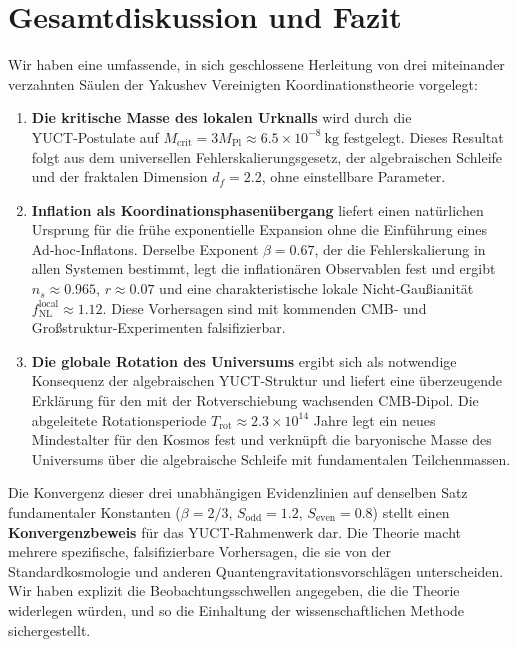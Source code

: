 \documentclass[11pt,a4paper]{article}
\begin{document}
	
	\part{Gesamtdiskussion und Fazit}
	\label{part:conclusion}
	
	Wir haben eine umfassende, in sich geschlossene Herleitung von drei miteinander verzahnten Säulen der Yakushev Vereinigten Koordinationstheorie vorgelegt:
	
	\begin{enumerate}
		\item \textbf{Die kritische Masse des lokalen Urknalls} wird durch die YUCT‑Postulate auf \(M_{\mathrm{crit}} = 3 M_{\mathrm{Pl}} \approx 6.5 \times 10^{-8}\ \text{kg}\) festgelegt. Dieses Resultat folgt aus dem universellen Fehlerskalierungsgesetz, der algebraischen Schleife und der fraktalen Dimension \(d_f = 2.2\), ohne einstellbare Parameter.
		
		\item \textbf{Inflation als Koordinationsphasenübergang} liefert einen natürlichen Ursprung für die frühe exponentielle Expansion ohne die Einführung eines Ad‑hoc‑Inflatons. Derselbe Exponent \(\beta = 0.67\), der die Fehlerskalierung in allen Systemen bestimmt, legt die inflationären Observablen fest und ergibt \(n_s \approx 0.965\), \(r \approx 0.07\) und eine charakteristische lokale Nicht‑Gaußianität \(f_{\mathrm{NL}}^{\mathrm{local}} \approx 1.12\). Diese Vorhersagen sind mit kommenden CMB- und Großstruktur‑Experimenten falsifizierbar.
		
		\item \textbf{Die globale Rotation des Universums} ergibt sich als notwendige Konsequenz der algebraischen YUCT‑Struktur und liefert eine überzeugende Erklärung für den mit der Rotverschiebung wachsenden CMB‑Dipol. Die abgeleitete Rotationsperiode \(T_{\mathrm{rot}} \approx 2.3 \times 10^{14}\) Jahre legt ein neues Mindestalter für den Kosmos fest und verknüpft die baryonische Masse des Universums über die algebraische Schleife mit fundamentalen Teilchenmassen.
	\end{enumerate}
	
	Die Konvergenz dieser drei unabhängigen Evidenzlinien auf denselben Satz fundamentaler Konstanten (\(\beta = 2/3\), \(S_{\mathrm{odd}}=1.2\), \(S_{\mathrm{even}}=0.8\)) stellt einen \textbf{Konvergenzbeweis} für das YUCT‑Rahmenwerk dar. Die Theorie macht mehrere spezifische, falsifizierbare Vorhersagen, die sie von der Standardkosmologie und anderen Quantengravitationsvorschlägen unterscheiden. Wir haben explizit die Beobachtungsschwellen angegeben, die die Theorie widerlegen würden, und so die Einhaltung der wissenschaftlichen Methode sichergestellt.
	
\end{document}
